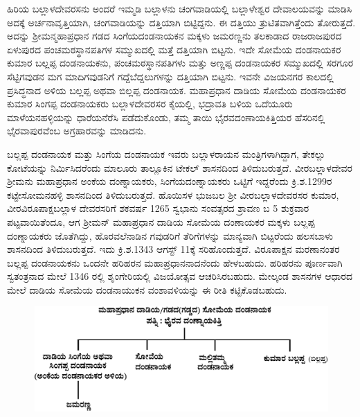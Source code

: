 ಹಿರಿಯ ಬಲ್ಲಾಳದೇವರಸನು ಅಂದರೆ ಇಮ್ಮಡಿ ಬಲ್ಲಾಳನು ಚಂಗವಾಡಿಯಲ್ಲಿ ಬಲ್ಲಾಳೇಶ್ವರ ದೇವಾಲಯವನ್ನು ಮಾಡಿಸಿ ಅದಕ್ಕೆ ಅರ್ಚನಾವೃತ್ತಿಯಾಗಿ, ಚಂಗವಾಡಿಯನ್ನು ದತ್ತಿಯಾಗಿ ಬಿಟ್ಟಿದ್ದನು. ಈ ದತ್ತಿಯು ತ್ರುಟಿತವಾಗಿತ್ತೆಂದು ತೋರುತ್ತದೆ. ಅದನ್ನು ಶ‍್ರೀಮನ್ಮಹಾಪ್ರಧಾನ ಗಡದ ಸಿಂಗೆಯದಂಡನಾಯಕನ ಮಕ್ಕಳು ಜಮರಣ್ಣನು ತಲಕಾಡಾದ ರಾಜರಾಜಪುರದ ಏಳುಪುರದ ಪಂಚಮಠಸ್ಥಾನಪತಿಗಳ ಸಮ್ಮುಖದಲ್ಲಿ ಮತ್ತೆ ದತ್ತಿಯಾಗಿ ಬಿಟ್ಟನು. ಇದೇ ಸೋಮೆಯ ದಂಡನಾಯಕರ ಕುಮಾರ ಬಲ್ಲಪ್ಪ ದಂಡನಾಯಕನು, ಪಂಚಮಠಸ್ಥಾನಪತಿಗಳು ಮತ್ತು ಅಣ್ಣಪ್ಪ ದಂಡನಾಯಕರ ಸಮ್ಮುಖದಲ್ಲಿ ಸರಗೂರ ಸೆಟ್ಟಿಗವುಡನ ಮಗ ಮಾದಿಗವುಡನಿಗೆ ಗದ್ದೆಬೆದ್ದಲುಗಳನ್ನು ದತ್ತಿಯಾಗಿ ಬಿಟ್ಟನು. ಇವನೇ ವಿಜಯನಗರ ಕಾಲದಲ್ಲಿ ಪ್ರಸಿದ್ಧನಾದ ಅಳಿಯ ಬಲ್ಲಪ್ಪ ಅಥವಾ ಬಿಲ್ಲಪ್ಪ ದಂಡನಾಯಕ. ಮಹಾಪ್ರಧಾನ ದಾಡಿಯ ಸೋಮೆಯ ದಂಡನಾಯಕರ ಕುಮಾರ ಸಿಂಗಪ್ಪ ದಂಡನಾಯಕರು ಬಲ್ಲಾಳದೇವರಸರ ಕೈಯಲ್ಲಿ, ಭದ್ರಾವತಿ ಬಳಿಯ ಒದೆಯೂರು ಮಾಳೆಯನಹಳ್ಳಿಯನ್ನು ಧಾರೆಯನೆರೆಸಿ ಪಡೆದುಕೊಂಡು, ತಮ್ಮ ತಾಯಿ ಭೈರವದಂಣಾಯಕಿತ್ತಿಯರ ಹೆಸರಿನಲ್ಲಿ ಭೈರವಾಪುರವೆಂಬ ಅಗ್ರಹಾರವನ್ನು ಮಾಡಿದನು.

\vskip 2pt

ಬಲ್ಲಪ್ಪ ದಂಡನಾಯಕ ಮತ್ತು ಸಿಂಗೆಯ ದಂಡನಾಯಕ ಇವರು ಬಲ್ಲಾಳರಾಯನ ಮಂತ್ರಿಗಳಾಗಿದ್ದಾಗ, ತೇಕಲ್ಲು ಕೋಟೆಯನ್ನು ನಿರ್ಮಿಸಿದರೆಂದು ಮಾಲೂರು ತಾಲ್ಲೂಕಿನ ಟೇಕಲ್​ ಶಾಸನದಿಂದ ತಿಳಿದುಬರುತ್ತದೆ. ವೀರಬಲ್ಲಾಳದೇವರ ಶ‍್ರೀಮನು ಮಹಾಪ್ರಧಾನ ಅಂಕೆಯ ದಂಣ್ನಾಯಕರು, ಸಿಂಗೆಯದಂಣ್ನಾಯಕರು ಒಟ್ಟಿಗೆ ಇದ್ದರೆಂದು ಕ್ರಿ.ಶ.1299ರ ಕಟ್ಟೇಸೋಮನಹಳ್ಳಿ ಶಾಸನದಿಂದ ತಿಳಿದುಬರುತ್ತದೆ. ಹೊಯಿಸಳ ಭುಜಬಲ ಶ‍್ರೀ ವೀರಬಲ್ಲಾಳದೇವರಸರ ಕುಮಾರ, ವೀರವಿರೂಪಾಕ್ಷಬಲ್ಲಾಳ ದೇವರಸರಿಗೆ ಶಕವರ್ಷ 1265 ಸ್ವಭಾನು ಸಂವತ್ಸರದ ಶ್ರಾವಣ ಬ 5 ಶುಕ್ರವಾರ ಪಟ್ಟವಾಯಿತೆಂದೂ, ಆಗ ಶ‍್ರೀಮನ್​ ಮಹಾಪ್ರಧಾನ ದಾಡಿಯ ಸೋಮೆಯ ದಂಣಾಯಕರ ಮಕ್ಕಳು ಬಲ್ಲಪ್ಪ ದಂಣ್ನಾಯಕರು ಜೊತೆಗಿದ್ದು, ಹೊರವಲೆನಾಡಿನ ಗವುಡರಿಗೆ ತೆರಿಗೆಗಳನ್ನು ಮಾನ್ಯವಾಗಿ ಬಿಟ್ಟರೆಂದು ಹಲಸಬಾಳು ಶಾಸನದಿಂದ ತಿಳಿದುಬರುತ್ತದೆ. ಇದು ಕ್ರಿ.ಶ.1343 ಆಗಸ್ಟ್​ 11ಕ್ಕೆ ಸರಿಹೊಂದುತ್ತದೆ. ವಿರೂಪಾಕ್ಷನ ಮರಣಾನಂತರ ಬಲ್ಲಪ್ಪ ದಂಡನಾಯಕನು ಒಂದನೇ ಹರಿಹರನ ಮಹಾಪ್ರಧಾನನಾದನೆಂದು ಹೇಳಬಹುದು. ಹರಿಹರನು ಪೂರ್ಣವಾಗಿ ಸ್ವತಂತ್ರನಾದ ಮೇಲೆ 1346 ರಲ್ಲಿ ಶೃಂಗೇರಿಯಲ್ಲಿ ವಿಜಯೋತ್ಸವ ಆಚರಿಸಿರಬಹುದು. ಮೇಲ್ಕಂಡ ಶಾಸನಗಳ ಆಧಾರದ ಮೇಲೆ ದಾಡಿಯ ಸೋಮೆಯ ದಂಡನಾಯುಕನ ವಂಶಾವಳಿಯನ್ನು ಈ ರೀತಿ ಕಟ್ಟಿಕೊಡ\-ಬಹುದು.

\begin{figure}[!h]
\includegraphics[scale=1.15]{images/chap3/chap3fig25.jpeg}
\end{figure}

